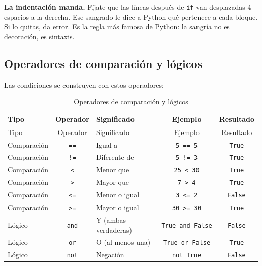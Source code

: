 \documentclass[
  spanish,
  letterpaper,
  DIV=11,
  numbers=noendperiod]{scrreprt}
\begin{document}
\begin{tcolorbox}[enhanced jigsaw, arc=.35mm, bottomrule=.15mm, bottomtitle=1mm, breakable, colback=white, colbacktitle=quarto-callout-warning-color!10!white, colframe=quarto-callout-warning-color-frame, coltitle=black, left=2mm, leftrule=.75mm, opacityback=0, opacitybacktitle=0.6, rightrule=.15mm, title=\textcolor{quarto-callout-warning-color}{\faExclamationTriangle}\hspace{0.5em}{Advertencia}, titlerule=0mm, toprule=.15mm, toptitle=1mm]

\textbf{La indentación manda.} Fíjate que las líneas después de
\texttt{if} van desplazadas 4 espacios a la derecha. Ese sangrado le
dice a Python qué pertenece a cada bloque. Si lo quitas, da error. Es la
regla más famosa de Python: la sangría no es decoración, es sintaxis.

\end{tcolorbox}

\subsection{Operadores de comparación y
lógicos}\label{operadores-de-comparaciuxf3n-y-luxf3gicos}

Las condiciones se construyen con estos operadores:

\begin{longtable}[]{@{}lclcc@{}}
\caption{Operadores de comparación y
lógicos}\label{tbl-comparacion}\tabularnewline
\toprule\noalign{}
Tipo & Operador & Significado & Ejemplo & Resultado \\
\midrule\noalign{}
\endfirsthead
\toprule\noalign{}
Tipo & Operador & Significado & Ejemplo & Resultado \\
\midrule\noalign{}
\endhead
\bottomrule\noalign{}
\endlastfoot
Comparación & \texttt{==} & Igual a & \texttt{5\ ==\ 5} &
\texttt{True} \\
Comparación & \texttt{!=} & Diferente de & \texttt{5\ !=\ 3} &
\texttt{True} \\
Comparación & \texttt{\textless{}} & Menor que &
\texttt{25\ \textless{}\ 30} & \texttt{True} \\
Comparación & \texttt{\textgreater{}} & Mayor que &
\texttt{7\ \textgreater{}\ 4} & \texttt{True} \\
Comparación & \texttt{\textless{}=} & Menor o igual &
\texttt{3\ \textless{}=\ 2} & \texttt{False} \\
Comparación & \texttt{\textgreater{}=} & Mayor o igual &
\texttt{30\ \textgreater{}=\ 30} & \texttt{True} \\
Lógico & \texttt{and} & Y (ambas verdaderas) & \texttt{True\ and\ False}
& \texttt{False} \\
Lógico & \texttt{or} & O (al menos una) & \texttt{True\ or\ False} &
\texttt{True} \\
Lógico & \texttt{not} & Negación & \texttt{not\ True} &
\texttt{False} \\
\end{longtable}
\end{document}
